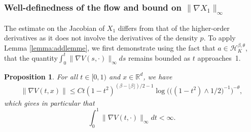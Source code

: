 \documentclass{article}
\newtheorem{proposition}{Proposition}
\begin{document}
\subsubsection{Well-definedness of the flow and bound on  $\|\nabla X_1\|_\infty$}
The estimate on the Jacobian of $X_1$ differs from that of the higher-order derivatives as it does not involve the derivatives of the density $p$. To apply Lemma \ref{lemma:addlemme}, we first demonstrate using the fact that  $a\in \mathcal{H}^{\beta,\theta}_K$, that the quantity$ \int_0^t \|\nabla V(s,\cdot)\|_{\infty}ds$ remains bounded as $t$ approaches~1.
\begin{proposition}\label{prop:boundnabalvgauss}
For all $t\in [0,1)$ and $x\in \mathbb{R}^d$,  we have 
\begin{align*}
    \|\nabla V(t,x)\|\leq C t(1-t^2)^{(\beta-\lfloor \beta \rfloor)/2-1}\log\Big(\big((1-t^2)\wedge 1/2\big)^{-1}\Big)^{-\theta},
\end{align*}
which gives in particular that
    $$\int_0^1 \|\nabla V(t,\cdot)\|_{\infty}dt<\infty.$$
\end{proposition}
\end{document}
